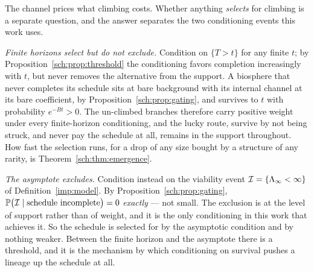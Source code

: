 \begin{remark}
\label{sch:rem:asymptote}
The channel prices what climbing costs. Whether anything \emph{selects}
for climbing is a separate question, and the answer separates the two
conditioning events this work uses.

\emph{Finite horizons select but do not exclude.} Condition on
$\{T>t\}$ for any finite $t$; by Proposition~\ref{sch:prop:threshold}
the conditioning favors completion increasingly with $t$, but never
removes the alternative from the support. A biosphere that never completes its schedule sits at bare
background with its internal channel at its bare coefficient, by
Proposition~\ref{sch:prop:gating}, and survives to $t$ with probability
$e^{-Bt}>0$. The un-climbed branches therefore carry
positive weight under every finite-horizon conditioning, and the lucky
route, survive by not being struck, and never pay the schedule at all, remains in the support throughout.
How fast the selection runs, for a drop of any size bought by a
structure of any rarity, is Theorem~\ref{sch:thm:emergence}.

\emph{The asymptote excludes.} Condition instead on the viability event
$\mathcal{I}=\{\Lambda_\infty<\infty\}$ of Definition~\ref{imp:model}. By
Proposition~\ref{sch:prop:gating},
$\mathbb{P}\bigl(\mathcal{I}\mid\text{schedule incomplete}\bigr)=0$ \emph{exactly} ---
not small. The exclusion is at the level of support rather than of
weight, and it is the only conditioning in this work that achieves it. So the schedule is selected for by the asymptotic condition and by
nothing weaker. Between the finite horizon and the asymptote there is a
threshold, and it is the mechanism by which conditioning on survival
pushes a lineage up the schedule at all.


\end{remark}
